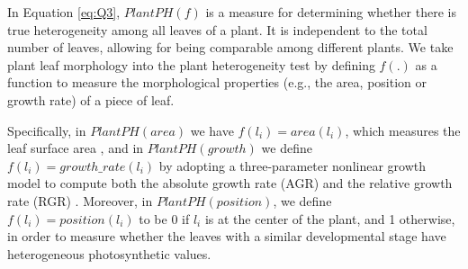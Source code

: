 \documentclass{bioinfo}
\begin{document}
\begin{methods}
In Equation \ref{eq:Q3}, $PlantPH(f)$ is a measure for determining whether there is true heterogeneity among all leaves of a plant. It is independent to the total number of leaves, allowing for being comparable among different plants. We take plant leaf morphology into the plant heterogeneity test by defining $f(.)$ as a function to measure the morphological properties (e.g., the area, position or growth rate) of a piece of leaf.

Specifically, in $PlantPH(area)$ we have $f(l_i)=area(l_i)$, which measures the leaf surface area \citep{boyes2001growth,tessmer2013functional}, and in $PlantPH(growth)$ we define $f(l_i)=growth\_rate(l_i)$ by adopting a three-parameter nonlinear growth model to compute both the absolute growth rate (AGR) and the relative growth rate (RGR) \citep{Richards1959,hunt1982plant,tessmer2013functional}. Moreover, in $PlantPH(position)$, we define $f(l_i)=position(l_i)$ to be 0 if $l_i$ is at the center of the plant, and 1 otherwise, in order to measure whether the leaves with a similar developmental stage have heterogeneous photosynthetic values.


%
%
%
%


\end{methods}
\end{document}
